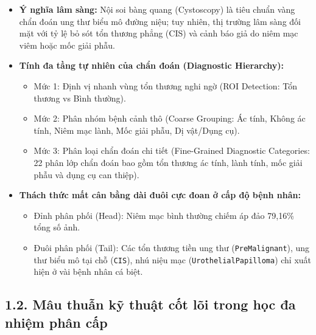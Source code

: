 \documentclass[
  10pt,
  a4paper,
  twocolumn]{article}
\providecommand{\tightlist}{%
  \setlength{\itemsep}{0pt}\setlength{\parskip}{0pt}}
\begin{document}
\begin{itemize}
\tightlist
\item
  \textbf{Ý nghĩa lâm sàng:} Nội soi bàng quang (Cystoscopy) là tiêu
  chuẩn vàng chẩn đoán ung thư biểu mô đường niệu; tuy nhiên, thị trường
  lâm sàng đối mặt với tỷ lệ bỏ sót tổn thương phẳng (CIS) và cảnh báo
  giả do niêm mạc viêm hoặc mốc giải phẫu.
\item
  \textbf{Tính đa tầng tự nhiên của chẩn đoán (Diagnostic Hierarchy):}

  \begin{itemize}
  \tightlist
  \item
    Mức 1: Định vị nhanh vùng tổn thương nghi ngờ (ROI Detection: Tổn
    thương vs Bình thường).
  \item
    Mức 2: Phân nhóm bệnh cảnh thô (Coarse Grouping: Ác tính, Không ác
    tính, Niêm mạc lành, Mốc giải phẫu, Dị vật/Dụng cụ).
  \item
    Mức 3: Phân loại chẩn đoán chi tiết (Fine-Grained Diagnostic
    Categories: 22 phân lớp chẩn đoán bao gồm tổn thương ác tính, lành
    tính, mốc giải phẫu và dụng cụ can thiệp).
  \end{itemize}
\item
  \textbf{Thách thức mất cân bằng dài đuôi cực đoan ở cấp độ bệnh nhân:}

  \begin{itemize}
  \tightlist
  \item
    Đỉnh phân phối (Head): Niêm mạc bình thường chiếm áp đảo 79,16\%
    tổng số ảnh.
  \item
    Đuôi phân phối (Tail): Các tổn thương tiền ung thư
    (\texttt{PreMalignant}), ung thư biểu mô tại chỗ (\texttt{CIS}), nhú
    niệu mạc (\texttt{UrothelialPapilloma}) chỉ xuất hiện ở vài bệnh
    nhân cá biệt.
  \end{itemize}
\end{itemize}

\subsection{1.2. Mâu thuẫn kỹ thuật cốt lõi trong học đa nhiệm phân
cấp}\label{muxe2u-thuux1eabn-kux1ef9-thuux1eadt-cux1ed1t-luxf5i-trong-hux1ecdc-ux111a-nhiux1ec7m-phuxe2n-cux1ea5p}
\end{document}
